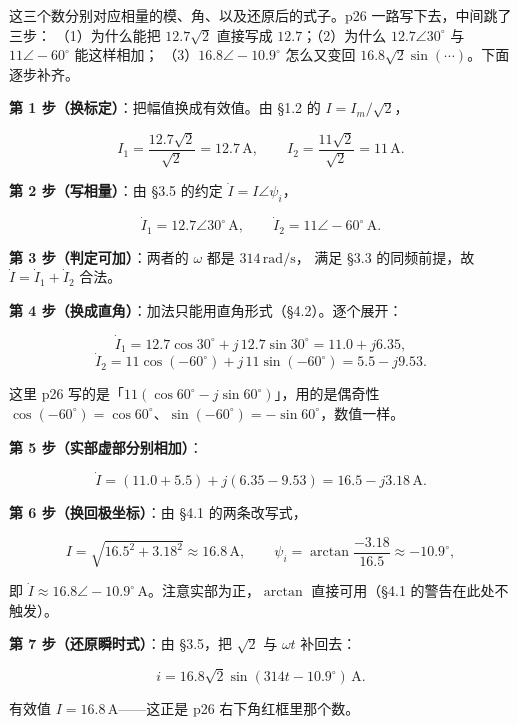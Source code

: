 \documentclass[11pt]{ctexart}
\begin{document}
这三个数分别对应相量的模、角、以及还原后的式子。p26 一路写下去，中间跳了三步：
（1）为什么能把 $12.7\sqrt2$ 直接写成 $12.7$；（2）为什么 $12.7\angle30^\circ$ 与 $11\angle-60^\circ$ 能这样相加；
（3）$16.8\angle-10.9^\circ$ 怎么又变回 $16.8\sqrt2\sin(\cdots)$。下面逐步补齐。


\textbf{第 1 步（换标定）}：把幅值换成有效值。由 §1.2 的 $I=I_m/\sqrt2$，

\[ I_1=\frac{12.7\sqrt2}{\sqrt2}=12.7\,\mathrm{A} ,\qquad
   I_2=\frac{11\sqrt2}{\sqrt2}=11\,\mathrm{A} . \]

\textbf{第 2 步（写相量）}：由 §3.5 的约定 $\dot I=I\angle\psi_i$，

\[ \dot I_1=12.7\angle30^\circ\,\mathrm{A} ,\qquad \dot I_2=11\angle-60^\circ\,\mathrm{A} . \]

\textbf{第 3 步（判定可加）}：两者的 $\omega$ 都是 $314\,\mathrm{rad/s}$，
满足 §3.3 的同频前提，故 $\dot I=\dot I_1+\dot I_2$ 合法。

\textbf{第 4 步（换成直角）}：加法只能用直角形式（§4.2）。逐个展开：

\[ \dot I_1=12.7\cos30^\circ+j\,12.7\sin30^\circ=11.0+j6.35 , \]
\[ \dot I_2=11\cos(-60^\circ)+j\,11\sin(-60^\circ)=5.5-j9.53 . \]

这里 p26 写的是「$11(\cos60^\circ-j\sin60^\circ)$」，用的是偶奇性
$\cos(-60^\circ)=\cos60^\circ$、$\sin(-60^\circ)=-\sin60^\circ$，数值一样。

\textbf{第 5 步（实部虚部分别相加）}：

\[ \dot I=(11.0+5.5)+j(6.35-9.53)=16.5-j3.18\,\mathrm{A} . \]

\textbf{第 6 步（换回极坐标）}：由 §4.1 的两条改写式，

\[ I=\sqrt{16.5^2+3.18^2}\approx16.8\,\mathrm{A} ,\qquad
   \psi_i=\arctan\frac{-3.18}{16.5}\approx-10.9^\circ , \]

即 $\dot I\approx16.8\angle-10.9^\circ\,\mathrm{A}$。注意实部为正，$\arctan$ 直接可用（§4.1 的警告在此处不触发）。

\textbf{第 7 步（还原瞬时式）}：由 §3.5，把 $\sqrt2$ 与 $\omega t$ 补回去：

\[ i=16.8\sqrt2\sin(314t-10.9^\circ)\,\mathrm{A} . \]

有效值 $I=16.8\,\mathrm{A}$——这正是 p26 右下角红框里那个数。

\end{document}
